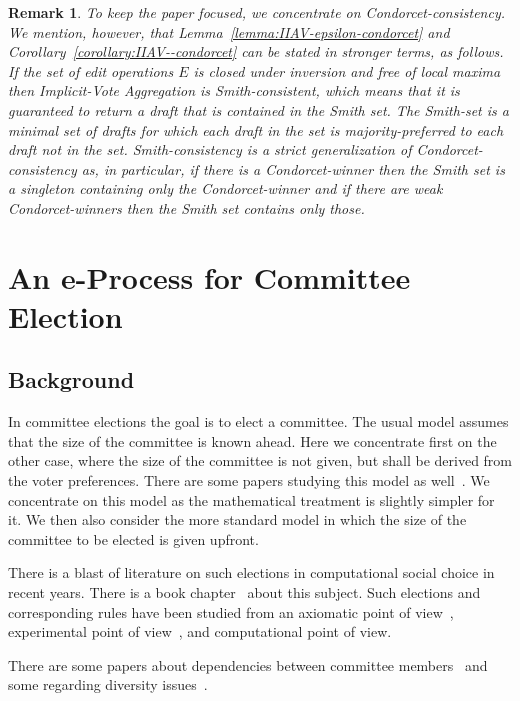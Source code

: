 \documentclass[sigconf]{aamas}  %
\newtheorem{remark}{Remark}
\begin{document}
\begin{remark}
%
To keep the paper focused, we concentrate on Condorcet-consistency. We mention, however, that Lemma~\ref{lemma:IIAV-epsilon-condorcet} and Corollary~\ref{corollary:IIAV--condorcet} can be stated in stronger terms, as follows. If the set of edit operations $E$ is closed under inversion and free of local maxima then Implicit-Vote Aggregation is Smith-consistent, which means that it is guaranteed to return a draft that is contained in the Smith set.  The Smith-set is a minimal set of drafts for which each draft in the set is majority-preferred to each draft not in the set. Smith-consistency is a strict generalization of Condorcet-consistency as, in particular, if there is a Condorcet-winner then the Smith set is a singleton containing only the Condorcet-winner and if there are weak Condorcet-winners then the Smith set contains only those.
%
\end{remark}


\section{An e-Process for Committee Election}
\label{section:commiteee election}


\subsection{Background}

In committee elections the goal is to elect a committee. The usual model assumes that the size of the committee is known ahead.
Here we concentrate first on the other case, where the size of the committee is not given, but shall be derived from the voter preferences. There are some papers studying this model as well~\cite{kilgourvnw,vnw}.
We concentrate on this model as the mathematical treatment is slightly simpler for it. We then also consider the more standard model in which the size of the committee to be elected is given upfront.

There is a blast of literature on such elections in computational social choice in recent years. There is a book chapter~\cite{mwchapter} about this subject. Such elections and corresponding rules have been studied from an axiomatic point of view~\cite{propertiesofmw,csrhierarchy}, experimental point of view~\cite{mw2d}, and computational point of view.

There are some papers about dependencies between committee members~\cite{interintra} and some regarding diversity issues~\cite{aziz2018rule,BFIa}.
\end{document}
